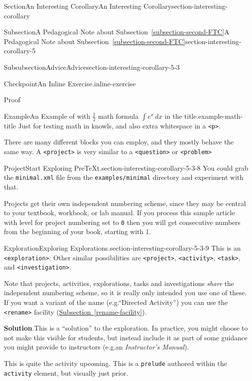 \documentclass[twoside,10pt,]{article}
\newcommand{\blocktitlefont}{\relax}
\newcommand{\xreffont}{\relax}
\newcommand{\mono}[1]{\texttt{#1}}
\newcommand{\pubtitle}[1]{\textsl{#1}}
\numberwithin{equation}{section}
\begin{document}
\begin{sectionptx}{Section}{An Interesting Corollary}{}{An Interesting Corollary}{}{}{section-interesting-corollary}
\begin{subsectionptx}{Subsection}{A Pedagogical Note about Subsection~{\xreffont\ref*{subsection-second-FTC}}}{}{A Pedagogical Note about Subsection~{\xreffont\ref*{subsection-second-FTC}}}{}{}{section-interesting-corollary-5}
\begin{subsubsectionptx}{Subsubsection}{Advice}{}{Advice}{}{}{section-interesting-corollary-5-3}
\begin{inlineexercise}{Checkpoint}{An Inline Exercise.}{inline-exercise}
\begin{solutionproof}{Proof}
\end{solutionproof}
\end{inlineexercise}%
\begin{example}{Example}{An Example of with \(\frac12\) math formula \(\displaystyle{\int e^x \, dx}\) in the title.}{example-math-title}%
Just for testing math in knowls, and also extra whitespace in a \mono{<p>}.%
\end{example}
There are many different blocks you can employ, and they mostly behave the same way.  A \mono{<project>} is very similar to a \mono{<question>} or \mono{<problem>}%
\begin{project}{Project}{Start Exploring PreTeXt.}{section-interesting-corollary-5-3-8}%
You could grab the \mono{minimal.xml} file from the \mono{examples/minimal} directory and experiment with that.%
\par
Projects get their own independent numbering scheme, since they may be central to your textbook, workbook, or lab manual.  If you process this sample article with level for project numbering set to \mono{0} then you will get consecutive numbers from the beginning of your book, starting with 1.%
\end{project}%
\begin{exploration}{Exploration}{Exploring Explorations.}{section-interesting-corollary-5-3-9}%
This is an \mono{<exploration>}.  Other similar possibilities are \mono{<project>}, \mono{<activity>}, \mono{<task>}, and \mono{<investigation>}.%
\par
Note that projects, activities, explorations, tasks and investigations \emph{share} the independent numbering scheme, so it is really only intended you use one of these.  If you want a variant of the name (e.g.\@ ``Directed Activity'') you can use the \mono{<rename>} facility (\hyperref[rename-facility]{Subsection~{\xreffont\ref{rename-facility}}}).%
\par\smallskip%
\noindent\textbf{\blocktitlefont Solution}.\hypertarget{section-interesting-corollary-5-3-9-3}{}\quad{}This is a ``solution'' to the exploration.  In practice, you might choose to not make this visible for students, but instead include it as part of some guidance you might provide to instructors (e.g.\@ an \pubtitle{Instructor's Manual}).%
\end{exploration}%
\par
This is quite the activity upcoming.  This is a \mono{prelude} authored within the \mono{activity} element, but visually just prior.%

\end{subsubsectionptx}
\end{subsectionptx}
\end{sectionptx}
\end{document}
